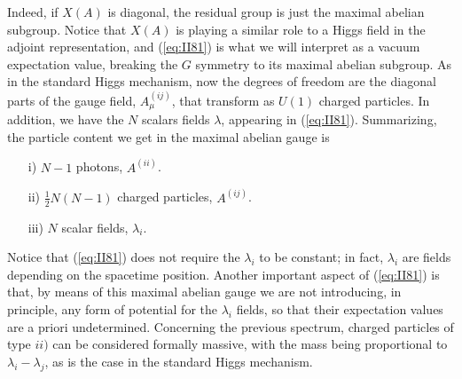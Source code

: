 Indeed, if $X(A)$ is diagonal, the residual group is just the
maximal abelian subgroup. Notice that $X(A)$ is playing a similar
role to a Higgs field in the adjoint representation, and
(\ref{eq:II81}) is what we will interpret as a vacuum expectation
value, breaking the $G$ symmetry to its maximal abelian subgroup.
As in the standard Higgs mechanism, now the degrees of freedom
are the diagonal parts of the gauge field, $A_{\mu}^{(ij)}$, that
transform as $U(1)$ charged particles. In addition, we have the $N$
scalars fields $\lambda$, appearing in (\ref{eq:II81}).
Summarizing, the particle content we get in the maximal abelian
gauge is
\begin{itemize}
	\item[{i)}] $N-1$ photons, $A^{(ii)}$.
	\item[{ii)}] $\frac {1}{2} N(N-1)$ charged particles,
$A^{(ij)}$.
	\item[{iii)}] $N$ scalar fields, $\lambda_i$.
\end{itemize}
Notice that (\ref{eq:II81}) does not require the $\lambda_i$ to
be constant; in fact, $\lambda_i$ are fields depending on the
spacetime position. Another important aspect of (\ref{eq:II81})
is that, by means of this maximal abelian gauge we are not
introducing, in principle, any form of potential for the
$\lambda_i$ fields, so that their expectation values are a priori
undetermined. Concerning the previous spectrum, charged particles
of type $ii)$ can be considered formally massive, with the mass
being proportional to $\lambda_i-\lambda_j$, as is the case in
the standard Higgs mechanism.
  
